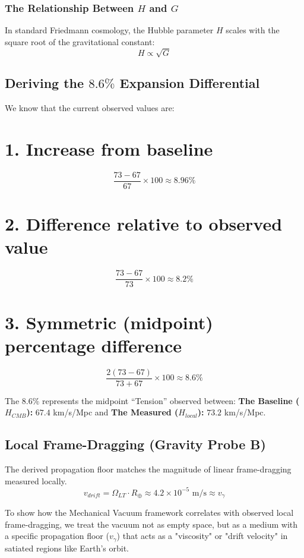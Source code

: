 \documentclass[12pt,a4paper]{article}
\begin{document}
\subsubsection*{The Relationship Between $H$ and $G$}
In standard Friedmann cosmology, the Hubble parameter $H$ scales with the square root of the gravitational constant:
\[ H \propto \sqrt{G} \]

\subsection{Deriving the $8.6\%$ Expansion Differential}
We know that the current observed values are:
\section*{1. Increase from baseline}
\[ \frac{73 - 67}{67} \times 100 \approx \mathbf{8.96\%} \]

\section*{2. Difference relative to observed value}
\[ \frac{73 - 67}{73} \times 100 \approx \mathbf{8.2\%} \]

\section*{3. Symmetric (midpoint) percentage difference}
\[ \frac{2(73 - 67)}{73 + 67} \times 100 \approx \mathbf{8.6\%} \]

The $8.6\%$ represents the midpoint ``Tension'' observed between: 
\textbf{The Baseline ($H_{CMB}$):} $67.4$ km/s/Mpc and 
\textbf{The Measured ($H_{local}$):} $73.2$ km/s/Mpc.



\subsection{Local Frame-Dragging (Gravity Probe B)}
The derived propagation floor matches the magnitude of linear frame-dragging measured locally.
\begin{equation}
v_{drift} = \Omega_{LT} \cdot R_{\oplus} \approx 4.2 \times 10^{-5} \text{ m/s} \approx v_{\gamma}
\end{equation}

To show how the Mechanical Vacuum framework correlates with observed local frame-dragging, we treat the vacuum not as empty space, but as a medium with a specific propagation floor ($v_\gamma$) that acts as a "viscosity" or "drift velocity" in satiated regions like Earth's orbit.
\end{document}
